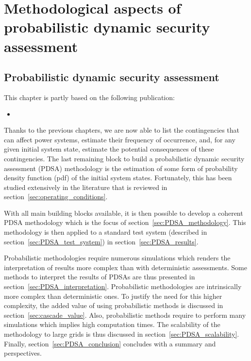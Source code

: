 \part{Methodological aspects of probabilistic dynamic security assessment}
\label{part:PDSA}
\chapter{Probabilistic dynamic security assessment}
\label{ch:DPSA}
\minitoc

\begin{tcolorbox}[width=\linewidth, sharp corners=all,
    colback=white!80!black,
    colframe=white!80!black]
This chapter is partly based on the following publication:
\begin{itemize}
    \item {}
\end{itemize}
\end{tcolorbox}

Thanks to the previous chapters, we are now able to list the contingencies that can affect power systems, estimate their frequency of occurrence, and, for any given initial system state, estimate the potential consequences of these contingencies. The last remaining block to build a probabilistic dynamic security assessment (PDSA) methodology is the estimation of some form of probability density function (pdf) of the initial system states. Fortunately, this has been studied extensively in the literature that is reviewed in section~\ref{sec:operating_conditions}.

With all main building blocks available, it is then possible to develop a coherent PDSA methodology which is the focus of section~\ref{sec:PDSA_methodology}. This methodology is then applied to a standard test system (described in section~\ref{sec:PDSA_test_system}) in section~\ref{sec:PDSA_results}.

Probabilistic methodologies require numerous simulations which renders the interpretation of results more complex than with deterministic assessments. Some methods to interpret the results of PDSAs are thus presented in section~\ref{sec:PDSA_interpretation}. Probabilistic methodologies are intrinsically more complex than deterministic ones. To justify the need for this higher complexity, the added value of using probabilistic methods is discussed in section~\ref{sec:cascade_value}. Also, probabilistic methods require to perform many simulations which implies high computation times. The scalability of the methodology to large grids is thus discussed in section~\ref{sec:PDSA_scalability}. Finally, section~\ref{sec:PDSA_conclusion} concludes with a summary and perspectives.

